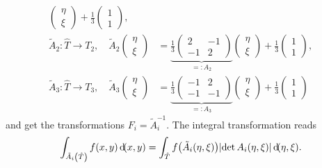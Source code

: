 \documentclass[english]{exercise}
\begin{document}
\begin{enumerate}
\begin{align*}
\begin{pmatrix}
                \eta\\
                \xi
            \end{pmatrix} + \frac{1}{3}\begin{pmatrix}
                1\\
                1
            \end{pmatrix},\\
            \tilde{A}_2: \hat{T} \to T_2, \quad \tilde{A}_2\begin{pmatrix}
                \eta\\
                \xi
            \end{pmatrix} &= \underbrace{\frac{1}{3}\begin{pmatrix}
                2 & -1\\
                -1 & 2
            \end{pmatrix}}_{=: A_2}\begin{pmatrix}
                \eta\\
                \xi
            \end{pmatrix} + \frac{1}{3}\begin{pmatrix}
                1\\
                1
            \end{pmatrix},\\
            \tilde{A}_3: \hat{T} \to T_3, \quad \tilde{A}_3\begin{pmatrix}
                \eta\\
                \xi
            \end{pmatrix} &= \underbrace{\frac{1}{3}\begin{pmatrix}
                -1 & 2\\
                -1 & -1
            \end{pmatrix}}_{=: A_3}\begin{pmatrix}
                \eta\\
                \xi
            \end{pmatrix} + \frac{1}{3}\begin{pmatrix}
                1\\
                1
            \end{pmatrix}
        \end{align*}
        and get the transformations \(F_i = \tilde{A}_i^{-1}\).
        The integral transformation reads
        \[
            \int_{\tilde{A}_i\parentheses*{\hat{T}}}f\parentheses*{x, y}\d\parentheses*{x, y} = \int_{\hat{T}}f\parentheses*{\tilde{A}_i\parentheses*{\eta, \xi}}\absolute*{\det A_i\parentheses*{\eta, \xi}}\d\parentheses*{\eta, \xi}.
\]
\end{enumerate}
\end{document}
